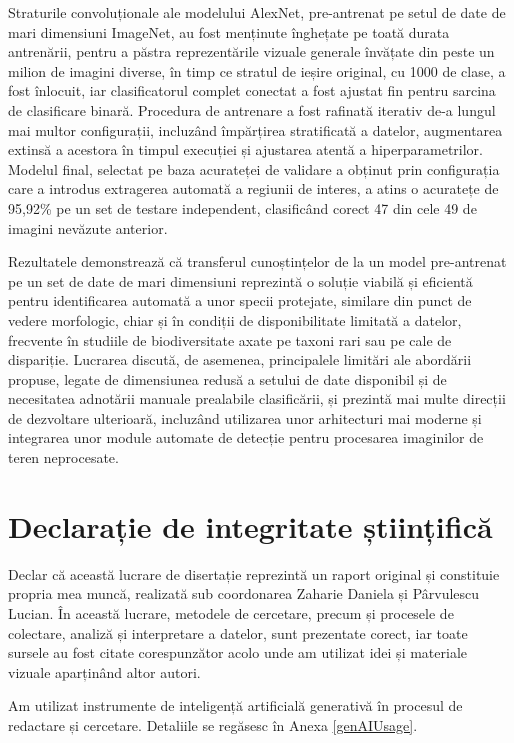 \documentclass[12pt,a4paper]{report}
\theoremstyle{definition}
\theoremstyle{remark}
\begin{document}
Straturile convoluționale ale modelului AlexNet, pre-antrenat pe setul de date de mari dimensiuni ImageNet, au fost menținute înghețate pe toată durata antrenării, pentru a păstra reprezentările vizuale generale învățate din peste un milion de imagini diverse, în timp ce stratul de ieșire original, cu 1000 de clase, a fost înlocuit, iar clasificatorul complet conectat a fost ajustat fin pentru sarcina de clasificare binară. Procedura de antrenare a fost rafinată iterativ de-a lungul mai multor configurații, incluzând împărțirea stratificată a datelor, augmentarea extinsă a acestora în timpul execuției și ajustarea atentă a hiperparametrilor. Modelul final, selectat pe baza acurateței de validare a obținut prin configurația care a introdus extragerea automată a regiunii de interes, a atins o acuratețe de 95,92\% pe un set de testare independent, clasificând corect 47 din cele 49 de imagini nevăzute anterior.

Rezultatele demonstrează că transferul cunoștințelor de la un model pre-antrenat pe un set de date de mari dimensiuni reprezintă o soluție viabilă și eficientă pentru identificarea automată a unor specii protejate, similare din punct de vedere morfologic, chiar și în condiții de disponibilitate limitată a datelor, frecvente în studiile de biodiversitate axate pe taxoni rari sau pe cale de dispariție. Lucrarea discută, de asemenea, principalele limitări ale abordării propuse, legate de dimensiunea redusă a setului de date disponibil și de necesitatea adnotării manuale prealabile clasificării, și prezintă mai multe direcții de dezvoltare ulterioară, incluzând utilizarea unor arhitecturi mai moderne și integrarea unor module automate de detecție pentru procesarea imaginilor de teren neprocesate.


\newpage

\section*{Declarație de integritate științifică}
Declar că această lucrare de disertație reprezintă un raport original și constituie propria mea muncă, realizată sub coordonarea Zaharie Daniela și Pârvulescu Lucian. În această lucrare, metodele de cercetare, precum și procesele de colectare, analiză și interpretare a datelor, sunt prezentate corect, iar toate sursele au fost citate corespunzător acolo unde am utilizat idei și materiale vizuale aparținând altor autori.

Am utilizat instrumente de inteligență artificială generativă în procesul de redactare și cercetare. Detaliile se regăsesc în Anexa \ref{genAIUsage}.
\end{document}
